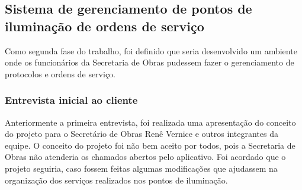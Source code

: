 \documentclass[
	article,			%
	11pt,				%
	oneside,			%
	a4paper,			%
	english,			%
	brazil,				%
	sumario=tradicional
	]{abntex2}
\begin{document}
\subsection{Sistema de gerenciamento de pontos de iluminação de ordens de serviço}

Como segunda fase do trabalho, foi definido que seria desenvolvido um ambiente
onde os funcionários da Secretaria de Obras pudessem fazer o gerenciamento de
protocolos e ordens de serviço.

\subsubsection{Entrevista inicial ao cliente}

Anteriormente a primeira entrevista, foi realizada uma apresentação do conceito
do projeto para o Secretário de Obras Renê Vernice e outros integrantes da
equipe. O conceito do projeto foi não bem aceito por todos, pois a Secretaria
de Obras não atenderia os chamados abertos pelo aplicativo. Foi acordado que o
projeto seguiria, caso fossem feitas algumas modificações que ajudassem na
organização dos serviços realizados nos pontos de iluminação.
\end{document}
